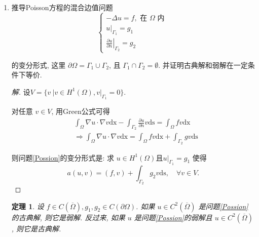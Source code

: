 \documentclass[12pt,a4paper]{article}
\newtheorem{theorem}{定理}
\begin{document}
\begin{enumerate}
\begin{proof}[证明]
			其中
			$$
			g(x)=|x|= \begin{cases}1, & 0<x<1 \\ -1, & -1<x<0\end{cases}
			$$
			
			显然$g$是局部Lesbegue可积函数,故$g$是$f$的一阶广义导数.
		\end{proof}
		
		\item 推导Poisson方程的混合边值问题
		\begin{equation} 
			\left\{\begin{array}{l}
				-\Delta u=f, \text { 在 } \Omega \text { 内 } \\
				\left.u\right|_{\Gamma_1}=g_1 \\
				\left.\frac{\partial u}{\partial n}\right|_{\Gamma_2}=g_2
			\end{array}\right. \label{Possion}
		\end{equation}
		
		
		
		的变分形式, 这里 $\partial \Omega=\Gamma_1 \cup \Gamma_2$, 且 $\Gamma_1 \cap \Gamma_2=\emptyset$. 并证明古典解和弱解在一定条件下等价.
		
		\begin{proof}[解]\let\qed\relax
			设$V = \{v\ | v \in H^1(\Omega), \left.v\right|_{\Gamma_1} = 0\}$.
			
			对任意 $v \in V$, 用Green公式可得
			$$
			\begin{aligned}
				& \int_{\Omega} \nabla u \cdot \nabla v \mathrm{dx}-\int_{\Gamma_2} \frac{\partial u}{\partial n} v \mathrm{ds}=\int_{\Omega} f v \mathrm{dx} \\
				& \Rightarrow \int_{\Omega} \nabla u \cdot \nabla v \mathrm{dx}=\int_{\Omega} f v \mathrm{dx}+\int_{\Gamma_2} g v \mathrm{ds}
			\end{aligned}
			$$
			
			则问题\eqref{Possion}的变分形式是: 求 $u \in H^1(\Omega)$且$\left.u\right|_{\Gamma_1} = g_1$ 使得
			\begin{equation}
				a(u, v)=(f, v)+\int_{\Gamma_2} g_2 v \mathrm{ds}, \quad \forall v \in V.
				\label{weak}
			\end{equation}
			
	
		
	\end{proof}
	
	\begin{theorem}
		设 $f \in C(\overline{\Omega}), g_1,g_2  \in C(\partial \Omega)$. 如果 $u \in C^2(\overline{\Omega})$ 是问题\eqref{Possion}的古典解, 则它是弱解. 反过来, 如果 $u$ 是问题\eqref{Possion}的弱解且 $u \in C^2(\overline{\Omega})$, 则它是古典解.
	\end{theorem}
	

\end{enumerate}
\end{document}
